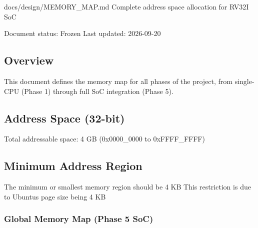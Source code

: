 \begin{relocated}{docs/design/MEMORY_MAP.md}
Complete address space allocation for RV32I SoC

Document status: Frozen Last updated: 2026-09-20

\subsection{Overview}\label{ds:mm:memory-map:overview}

This document defines the memory map for all phases of the project, from
single-CPU (Phase 1) through full SoC integration (Phase 5).

\subsection{Address Space (32-bit)}\label{ds:mm:memory-map:address-space-32-bit}

Total addressable space: 4 GB (0x0000\_\allowbreak{}0000 to
0xFFFF\_\allowbreak{}FFFF)

\subsection{Minimum Address Region}\label{ds:mm:memory-map:minimum-address-region}

The minimum or smallest memory region should be 4 KB This restriction is
due to Ubuntu\textquotesingle s page size being 4 KB

\subsubsection{Global Memory Map (Phase 5 SoC)}\label{ds:mm:memory-map:global-memory-map-phase-5-soc}

{\small\setlength{\tabcolsep}{4pt}

}
\end{relocated}
